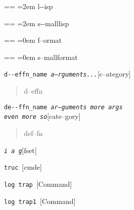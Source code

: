 \documentclass{book}
\makeatletter
\newcommand\GNUTexinfocommandstyletextvar[1]{{\normalfont{}\textsl{#1}}}%
\newenvironment{GNUTexinfopreformatted}{%
  \par\obeylines\obeyspaces\frenchspacing
  \parskip=\z@\parindent=\z@}{}
\makeatother
\begin{document}
\begin{GNUTexinfopreformatted}
\leftskip=2em\relax\ttfamily%
l{-}{-}isp
\end{GNUTexinfopreformatted}

\begin{GNUTexinfopreformatted}
\leftskip=2em\relax\ttfamily\footnotesize%
s{-}{-}malllisp
\end{GNUTexinfopreformatted}

\begin{GNUTexinfopreformatted}
\leftskip=0em\relax%
f--ormat
\end{GNUTexinfopreformatted}

\begin{GNUTexinfopreformatted}
\leftskip=0em\relax\footnotesize%
s--mallformat
\end{GNUTexinfopreformatted}

\noindent\texttt{d{-}{-}effn\_name \EmbracOn{}\textnormal{\textsl{a--rguments...}}\EmbracOff{}}\hfill[c--ategory]



%
\begin{quote}
\unskip{\parskip=0pt\noindent}%
d--effn
\end{quote}

\noindent\texttt{de{-}{-}ffn\_name \EmbracOn{}\textnormal{\textsl{ar--guments    more args \leavevmode{}\\ even more so}}\EmbracOff{}}\hfill[cate--gory]



%
\begin{quote}
\unskip{\parskip=0pt\noindent}%
def--fn
\end{quote}

\noindent\texttt{\GNUTexinfocommandstyletextvar{i} \EmbracOn{}\textnormal{\textsl{a g}}\EmbracOff{}}\hfill[fset]



\index[fn]{i@\texttt{\GNUTexinfocommandstyletextvar{i}}}%
%
\noindent\texttt{truc \EmbracOn{}\textnormal{\textsl{}}\EmbracOff{}}\hfill[cmde]



%
\noindent\texttt{log trap \EmbracOn{}\textnormal{\textsl{}}\EmbracOff{}}\hfill[Command]



%
\noindent\texttt{log trap1 \EmbracOn{}\textnormal{\textsl{}}\EmbracOff{}}\hfill[Command]
\end{document}
